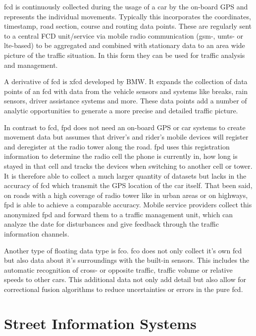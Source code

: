 \acrfull{fcd} is continuously collected during the usage of a car by the on-board GPS and represents the individual movements. Typically this incorporates the coordinates, timestamp, road section, course and routing data points. These are regularly sent to a central FCD unit/service via mobile radio communication (\acrshort{gsm}-, \acrshort{umts}- or \acrshort{lte}-based) to be aggregated and combined with stationary data to an area wide picture of the traffic situation. In this form they can be used for traffic analysis and management. \parencite{Randelhoff2016,LAPID2020}

A derivative of \acrshort{fcd} is \acrfull{xfcd} developed by BMW. It expands the collection of data points of an \acrshort{fcd} with data from the vehicle sensors and systems like breaks, rain sensors, driver assistance systems and more. These data points add a number of analytic opportunities to generate a more precise and detailed traffic picture. \parencite{LAPID2020}

In contrast to \acrshort{fcd}, \acrlong{fpd} does not need an on-board GPS or car systems to create movement data but assumes that driver’s and rider’s mobile devices will register and deregister at the radio tower along the road. \acrshort{fpd} uses this registration information to determine the radio cell the phone is currently in, how long is stayed in that cell and tracks the devices when switching to another cell or tower. It is therefore able to collect a much larger quantity of datasets but lacks in the accuracy of \acrshort{fcd} which transmit the GPS location of the car itself. That been said, on roads with a high coverage of radio tower like in urban areas or on highways, \acrshort{fpd} is able to achieve a comparable accuracy. Mobile service providers collect this anonymized \acrshort{fpd} and forward them to a traffic management unit, which can analyze the date for disturbances and give feedback through the traffic information channels. \parencite{Randelhoff2016,LAPID2020}

Another type of floating data type is \acrfull{fco}. \acrshort{fco} does not only collect it's own \acrshort{fcd} but also data about it's surroundings with the built-in sensors. This includes the automatic recognition of cross- or opposite traffic, traffic volume or relative speeds to other cars. This additional data not only add detail but also allow for correctional fusion algorithms to reduce uncertainties or errors in the pure \acrshort{fcd}. \parencite{Randelhoff2016}

\section{Street Information Systems}
\label{introduction_street_information_systems}

